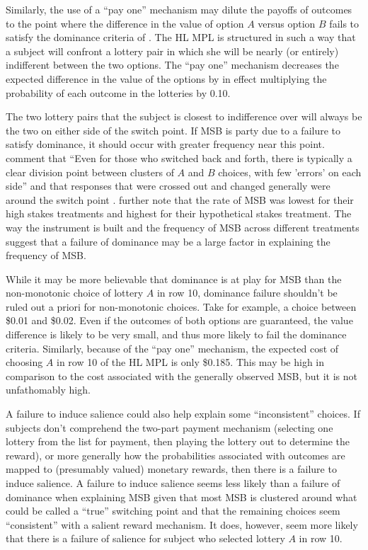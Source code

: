 \documentclass[../main.tex]{subfiles}
\begin{document}
Similarly, the use of a \enquote{pay one} mechanism may dilute the payoffs of outcomes to the point where the difference in the value of option $A$ versus option $B$ fails to satisfy the dominance criteria of \textcite{Smith1982}.
The HL MPL is structured in such a way that a subject will confront a lottery pair in which she will be nearly (or entirely) indifferent between the two options.
The \enquote{pay one} mechanism decreases the expected difference in the value of the options by in effect multiplying the probability of each outcome in the lotteries by 0.10. 

The two lottery pairs that the subject is closest to indifference over will always be the two on either side of the switch point.
If MSB is party due to a failure to satisfy dominance, it should occur with greater frequency near this point.
\textcite[1648]{Holt2002} comment that \enquote{Even for those who switched back and forth, there is typically a clear division point between clusters of $A$ and $B$ choices, with few 'errors' on each side} and that responses that were crossed out and changed generally were around the switch point \parencite*[1646]{Holt2002}.
\textcite[1647-1648]{Holt2002} further note that the rate of MSB was lowest for their high stakes treatments and highest for their hypothetical stakes treatment.
The way the instrument is built and the frequency of MSB across different treatments suggest that a failure of dominance may be a large factor in explaining the frequency of MSB.

While it may be more believable that dominance is at play for MSB than the non-monotonic choice of lottery $A$ in row 10, dominance failure shouldn't be ruled out a priori for non-monotonic choices.
Take for example, a choice between \$0.01 and \${0.02}.
Even if the outcomes of both options are guaranteed, the value difference is likely to be very small, and thus more likely to fail the dominance criteria.
Similarly, because of the \enquote{pay one} mechanism, the expected cost of choosing $A$ in row 10 of the HL MPL is only \${0.185}.
This may be high in comparison to the cost associated with the generally observed MSB, but it is not unfathomably high.

A failure to induce salience could also help explain some \enquote{inconsistent} choices.
If subjects don't comprehend the two-part payment mechanism (selecting one lottery from the list for payment, then playing the lottery out to determine the reward), or more generally how the probabilities associated with outcomes are mapped to (presumably valued) monetary rewards, then there is a failure to induce salience.
A failure to induce salience seems less likely than a failure of dominance when explaining MSB given that most MSB is clustered around what could be called a \enquote{true} switching point and that the remaining choices seem \enquote{consistent} with a salient reward mechanism.
It does, however, seem more likely that there is a failure of salience for subject who selected lottery $A$ in row 10.
\end{document}
